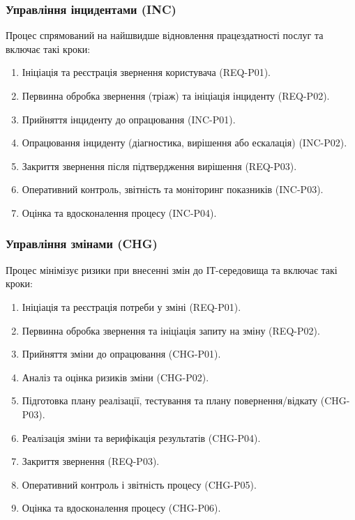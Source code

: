 \documentclass{article}
\begin{document}
\subsubsection{Управління інцидентами (INC)}
Процес спрямований на найшвидше відновлення працездатності послуг та включає такі кроки:
\begin{enumerate}
    \item Ініціація та реєстрація звернення користувача (REQ-P01).
    \item Первинна обробка звернення (тріаж) та ініціація інциденту (REQ-P02).
    \item Прийняття інциденту до опрацювання (INC-P01).
    \item Опрацювання інциденту (діагностика, вирішення або ескалація) (INC-P02).
    \item Закриття звернення після підтвердження вирішення (REQ-P03).
    \item Оперативний контроль, звітність та моніторинг показників (INC-P03).
    \item Оцінка та вдосконалення процесу (INC-P04).
\end{enumerate}

\subsubsection{Управління змінами (CHG)}
Процес мінімізує ризики при внесенні змін до ІТ-середовища та включає такі кроки:
\begin{enumerate}
    \item Ініціація та реєстрація потреби у зміні (REQ-P01).
    \item Первинна обробка звернення та ініціація запиту на зміну (REQ-P02).
    \item Прийняття зміни до опрацювання (CHG-P01).
    \item Аналіз та оцінка ризиків зміни (CHG-P02).
    \item Підготовка плану реалізації, тестування та плану повернення/відкату (CHG-P03).
    \item Реалізація зміни та верифікація результатів (CHG-P04).
    \item Закриття звернення (REQ-P03).
    \item Оперативний контроль і звітність процесу (CHG-P05).
    \item Оцінка та вдосконалення процесу (CHG-P06).
\end{enumerate}
\end{document}
